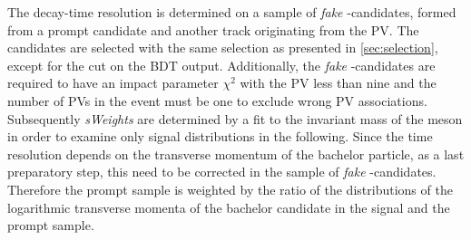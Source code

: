 The decay-time resolution is determined on a sample of \emph{fake} \Bz-candidates, formed from a prompt \Dpm candidate and another track originating from the PV.
The candidates are selected with the same selection as presented in \cref{sec:selection}, except for the cut on the BDT output.
Additionally, the \emph{fake} \Bz-candidates are required to have an impact parameter $\chi^2$ with the PV less than nine and the number of \ac{PV}s in the event must be one to exclude wrong \ac{PV} associations.
Subsequently \emph{sWeights} are determined by a fit to the invariant mass of the \Dpm meson in order to examine only signal distributions in the following.
Since the time resolution depends on the transverse momentum of the bachelor particle, as a last preparatory step, this need to be corrected in the sample of \emph{fake} \Bz-candidates.
Therefore the prompt sample is weighted by the ratio of the distributions of the logarithmic transverse momenta of the bachelor candidate in the signal \BdToDpi and the prompt sample.

